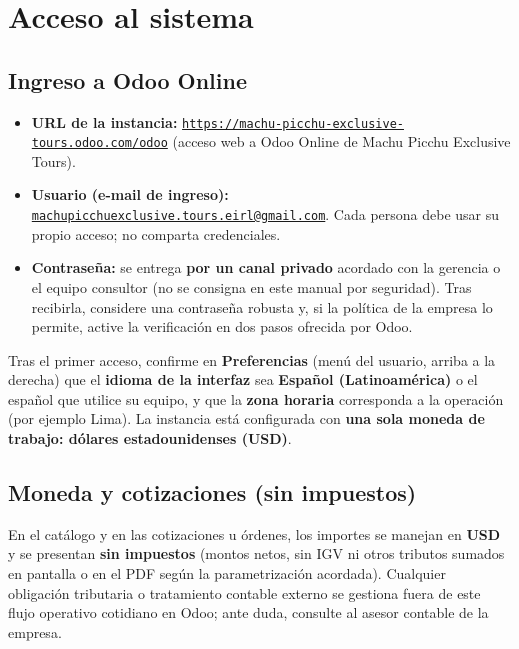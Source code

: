 \section{Acceso al sistema}

\subsection{Ingreso a Odoo Online}

\begin{itemize}
    \item \textbf{URL de la instancia:} \href{https://machu-picchu-exclusive-tours.odoo.com/odoo}{\texttt{https://machu-picchu-exclusive-tours.odoo.com/odoo}} (acceso web a Odoo Online de Machu Picchu Exclusive Tours).
    \item \textbf{Usuario (e-mail de ingreso):} \href{mailto:machupicchuexclusive.tours.eirl@gmail.com}{\texttt{machupicchuexclusive.tours.eirl@gmail.com}}. Cada persona debe usar su propio acceso; no comparta credenciales.
    \item \textbf{Contraseña:} se entrega \textbf{por un canal privado} acordado con la gerencia o el equipo consultor (no se consigna en este manual por seguridad). Tras recibirla, considere una contraseña robusta y, si la política de la empresa lo permite, active la verificación en dos pasos ofrecida por Odoo.
\end{itemize}

Tras el primer acceso, confirme en \textbf{Preferencias} (menú del usuario, arriba a la derecha) que el \textbf{idioma de la interfaz} sea \textbf{Español (Latinoamérica)} o el español que utilice su equipo, y que la \textbf{zona horaria} corresponda a la operación (por ejemplo Lima). La instancia está configurada con \textbf{una sola moneda de trabajo: dólares estadounidenses (USD)}.

\subsection{Moneda y cotizaciones (sin impuestos)}

En el catálogo y en las cotizaciones u órdenes, los importes se manejan en \textbf{USD} y se presentan \textbf{sin impuestos} (montos netos, sin IGV ni otros tributos sumados en pantalla o en el PDF según la parametrización acordada). Cualquier obligación tributaria o tratamiento contable externo se gestiona fuera de este flujo operativo cotidiano en Odoo; ante duda, consulte al asesor contable de la empresa.

